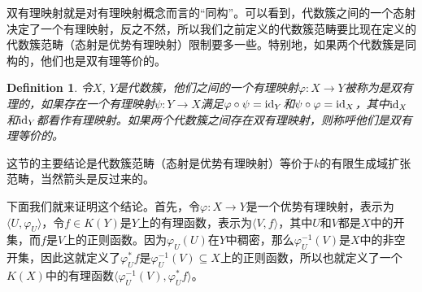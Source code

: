 \documentclass[9pt]{extarticle}
\theoremstyle{plain}%
\newtheorem{defi}{Definition}[section]%
\begin{document}
双有理映射就是对有理映射概念而言的“同构”。可以看到，代数簇之间的一个态射决定了一个有理映射，反之不然，所以我们之前定义的代数簇范畴要比现在定义的代数簇范畴（态射是优势有理映射）限制要多一些。特别地，如果两个代数簇是同构的，他们也是双有理等价的。
\begin{defi}
令$X$, $Y$是代数簇，他们之间的一个有理映射$\varphi : X\to Y$被称为是双有理的，如果存在一个有理映射$\psi:Y\to X$满足$\varphi\circ \psi=\operatorname{id}_Y$和$\psi\circ \varphi=\operatorname{id}_X$，其中$\operatorname{id}_X$和$\operatorname{id}_Y$都看作有理映射。如果两个代数簇之间存在双有理映射，则称呼他们是双有理等价的。
\end{defi}

这节的主要结论是代数簇范畴（态射是优势有理映射）等价于$k$的有限生成域扩张范畴，当然箭头是反过来的。

下面我们就来证明这个结论。首先，令$\varphi:X\to Y$是一个优势有理映射，表示为$\langle U,\varphi_U\rangle$，令$f\in K(Y)$是$Y$上的有理函数，表示为$\langle V,f\rangle$，其中$U$和$V$都是$X$中的开集，而$f$是$V$上的正则函数。因为$\varphi_U(U)$在$Y$中稠密，那么$\varphi_U^{-1}(V)$是$X$中的非空开集，因此这就定义了$\varphi_U^*f$是$\varphi_U^{-1}(V)\subseteq X$上的正则函数，所以也就定义了一个$K(X)$中的有理函数$\langle \varphi_U^{-1}(V),\varphi_U^*f\rangle$。
\end{document}
